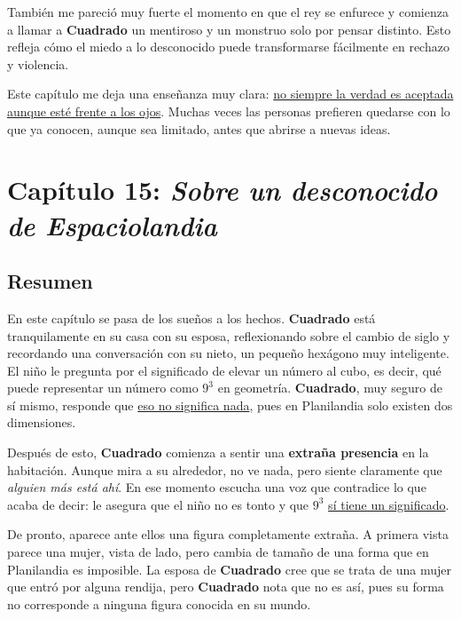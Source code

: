 \documentclass{article}
\begin{document}
También me pareció muy fuerte el momento en que el rey se enfurece y comienza a llamar a \textbf{Cuadrado} un mentiroso y un monstruo solo por pensar distinto. Esto refleja cómo el miedo a lo desconocido puede transformarse fácilmente en rechazo y violencia.

Este capítulo me deja una enseñanza muy clara: \underline{no siempre la verdad es aceptada aunque esté frente a los ojos}. Muchas veces las personas prefieren quedarse con lo que ya conocen, aunque sea limitado, antes que abrirse a nuevas ideas.

\section*{\textcolor{Cerulean}{Capítulo 15: \emph{Sobre un desconocido de Espaciolandia}}}

\subsection*{Resumen}

En este capítulo se pasa de los sueños a los hechos. \textbf{Cuadrado} está tranquilamente en su casa con su esposa, reflexionando sobre el cambio de siglo y recordando una conversación con su nieto, un pequeño hexágono muy inteligente. El niño le pregunta por el significado de elevar un número al cubo, es decir, qué puede representar un número como \(9^3\) en geometría. \textbf{Cuadrado}, muy seguro de sí mismo, responde que \underline{eso no significa nada}, pues en Planilandia solo existen dos dimensiones.

Después de esto, \textbf{Cuadrado} comienza a sentir una \textbf{extraña presencia} en la habitación. Aunque mira a su alrededor, no ve nada, pero siente claramente que \emph{alguien más está ahí}. En ese momento escucha una voz que contradice lo que acaba de decir: le asegura que el niño no es tonto y que \(9^3\) \underline{sí tiene un significado}.

De pronto, aparece ante ellos una figura completamente extraña. A primera vista parece una mujer, vista de lado, pero cambia de tamaño de una forma que en Planilandia es imposible. La esposa de \textbf{Cuadrado} cree que se trata de una mujer que entró por alguna rendija, pero \textbf{Cuadrado} nota que no es así, pues su forma no corresponde a ninguna figura conocida en su mundo.
\end{document}
